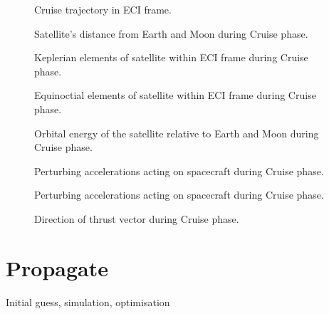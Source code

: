 \begin{figure}
\centering
%
\caption{Cruise trajectory in ECI frame.}
\label{fig:Cruise-3D}
\end{figure}

\begin{figure}
\centering
%
\caption{Satellite's distance from Earth and Moon during Cruise phase.}
\label{fig:Cruise-dist}
\end{figure}

\begin{figure}
\centering
%
\caption{Keplerian elements of satellite within ECI frame during Cruise phase.}
\label{fig:Cruise-kep}
\end{figure}

\begin{figure}
\centering
%
\caption{Equinoctial elements of satellite within ECI frame during Cruise phase.}
\label{fig:Cruise-mee}
\end{figure}

\begin{figure}
\centering
%
\caption{Orbital energy of the satellite relative to Earth and Moon during Cruise phase.}
\label{fig:Cruise-orbeng}
\end{figure}

\begin{figure}
\centering
%
\caption{Perturbing accelerations acting on spacecraft during Cruise phase.}
\label{fig:Cruise-pert}
\end{figure}

\begin{figure}
\centering
%
\caption{Perturbing accelerations acting on spacecraft during Cruise phase.}
\label{fig:Cruise-pert2}
\end{figure}

\begin{figure}
\centering
%
\caption{Direction of thrust vector during Cruise phase.}
\label{fig:Cruise-thrust}
\end{figure}


\clearpage 

\section{Propagate}
Initial guess, simulation, optimisation

